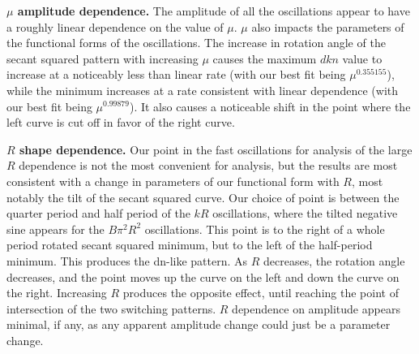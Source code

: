 \documentclass[11pt]{article}
\begin{document}
\textbf{\(\mu\) amplitude dependence.} The amplitude of all the oscillations
appear to have a roughly linear dependence on the value of \(\mu\).
\(\mu\) also impacts the parameters of the functional forms of the
oscillations. The increase in rotation angle of the secant squared
pattern with increasing \(\mu\) causes the maximum \(dkn\) value to
increase at a noticeably less than linear rate (with our best fit being
\(\mu^{0.355155}\)), while the minimum increases at a rate consistent
with linear dependence (with our best fit being \(\mu^{0.99879}\)). It
also causes a noticeable shift in the point where the left curve is cut
off in favor of the right curve.

\textbf{\(R\) shape dependence.} Our point in the fast oscillations for analysis
of the large \(R\) dependence is not the most convenient for analysis,
but the results are most consistent with a change in parameters of our
functional form with \(R\), most notably the tilt of the secant squared
curve. Our choice of point is between the quarter period and half period
of the \(kR\) oscillations, where the tilted negative sine appears for
the \(B\pi^2R^2\) oscillations. This point is to the right of a whole
period rotated secant squared minimum, but to the left of the
half-period minimum. This produces the dn-like pattern. As \(R\)
decreases, the rotation angle decreases, and the point moves up the
curve on the left and down the curve on the right. Increasing \(R\)
produces the opposite effect, until reaching the point of intersection
of the two switching patterns. \(R\) dependence on amplitude appears
minimal, if any, as any apparent amplitude change could just be a
parameter change.

    


    
    
    
\end{document}
